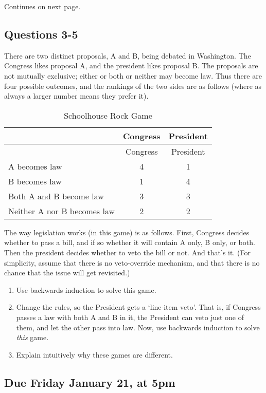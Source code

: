\documentclass[
  11pt,
]{article}
\providecommand{\tightlist}{%
  \setlength{\itemsep}{0pt}\setlength{\parskip}{0pt}}
\begin{document}
Continues on next page.

\newpage

\hypertarget{questions-3-5}{%
\subsection{Questions 3-5}\label{questions-3-5}}

There are two distinct proposals, A and B, being debated in Washington.
The Congress likes proposal A, and the president likes proposal B. The
proposals are not mutually exclusive; either or both or neither may
become law. Thus there are four possible outcomes, and the rankings of
the two sides are as follows (where as always a larger number means they
prefer it).

\begin{longtable}[]{@{}lcc@{}}
\caption{Schoolhouse Rock Game}\tabularnewline
\toprule
& Congress & President \\
\midrule
\endfirsthead
\toprule
& Congress & President \\
\midrule
\endhead
A becomes law & 4 & 1 \\
B becomes law & 1 & 4 \\
Both A and B become law & 3 & 3 \\
Neither A nor B becomes law & 2 & 2 \\
\bottomrule
\end{longtable}

The way legislation works (in this game) is as follows. First, Congress
decides whether to pass a bill, and if so whether it will contain A
only, B only, or both. Then the president decides whether to veto the
bill or not. And that's it. (For simplicity, assume that there is no
veto-override mechanism, and that there is no chance that the issue will
get revisited.)

\begin{enumerate}
\def\labelenumi{\arabic{enumi}.}
\setcounter{enumi}{2}
\tightlist
\item
  Use backwards induction to solve this game.
\item
  Change the rules, so the President gets a `line-item veto'. That is,
  if Congress passes a law with both A and B in it, the President can
  veto just one of them, and let the other pass into law. Now, use
  backwards induction to solve \emph{this} game.
\item
  Explain intuitively why these games are different.
\end{enumerate}

\hypertarget{due-friday-january-21-at-5pm}{%
\subsection{Due Friday January 21, at
5pm}\label{due-friday-january-21-at-5pm}}
\end{document}
